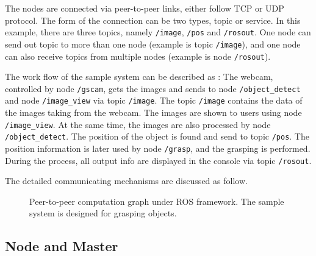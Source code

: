 \documentclass[a4paper, 10pt, conference]{ieeeconf}       %
\begin{document}
The nodes are connected via peer-to-peer links, either follow TCP or UDP protocol. The form of the connection can be two types, topic or service. In this example, there are three topics, namely \texttt{/image}, \texttt{/pos} and \texttt{/rosout}. One node can send out topic to more than one node (example is topic \texttt{/image}), and one node can also receive topics from multiple nodes (example is node \texttt{/rosout}). 

The work flow of the sample system can be described as : The webcam, controlled by node \texttt{/gscam}, gets the images and sends to node \texttt{/object\_detect} and node \texttt{/image\_view} via topic \texttt{/image}. The topic \texttt{/image} contains the data of the images taking from the webcam. The images are shown to users using node \texttt{/image\_view}. At the same time, the images are also processed by node \texttt{/object\_detect}. The position of the object is found and send to topic \texttt{/pos}. The position information is later used by node \texttt{/grasp}, and the grasping is performed. During the process, all output info are displayed in the console via topic \texttt{/rosout}.

The detailed communicating mechanisms are discussed as follow.

\begin{figure}[htpb]
  \centering
  \caption{Peer-to-peer computation graph under ROS framework. The sample system is designed for grasping objects.}
  \label{fig:framework}
\end{figure}



\subsection{Node and Master}
\end{document}
